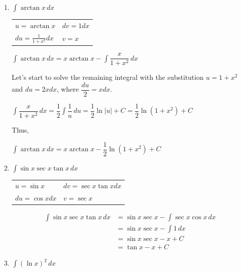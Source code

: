 \documentclass{article}
\begin{document}
\begin{enumerate}
\pspace{\vfill}

\item $\displaystyle \int \arctan x\,dx$ 

\begin{solution}
\begin{center}
    \begin{tabular}{ l l }
  $u=\arctan x$ &  $dv =1 dx$  \\
  $du=\frac{1}{1+x^2}dx$ &  $v=x$  \\
\end{tabular}

$\displaystyle \int \arctan x\,dx = x\arctan x - \displaystyle \int \dfrac{x}{1+x^2}\,dx$
\end{center}
Let's start to solve the remaining integral with the substitution $u=1+x^2$ and $du=2xdx$, where $\dfrac{du}{2}=xdx$.
\begin{center}
$\displaystyle \int \dfrac{x}{1+x^2}\,dx=\dfrac{1}{2}\displaystyle \int \dfrac{1}{u}\,du=\dfrac{1}{2}\ln |u|+C=\dfrac{1}{2}\ln(1+x^2)+C$ 
\end{center}
Thus,
\begin{center}
$\displaystyle \int \arctan x\,dx = x\arctan x - \dfrac{1}{2}\ln(1+x^2)+C$    
\end{center}
\end{solution}
\pspace{\vfill}
\pspace{\newpage}
\item $\displaystyle \int \sin x \sec x \tan x\,dx$ 

\begin{solution}
    \begin{center}
    \begin{tabular}{ l l }
  $u=\sin x$ &  $dv =\sec x \tan x dx$  \\
  $du=\cos xdx$ &  $v=\sec x$  \\
\end{tabular}
\begin{align*}
\displaystyle \int \sin x \sec x \tan x\,dx &= \sin x \sec x - \displaystyle \int \sec x \cos x \,dx \\ &= \sin x \sec x - \displaystyle \int 1 \,dx \\ &= \sin x \sec x - x + C \\ &= \tan x - x + C
\end{align*}
\end{center}
\end{solution}
\pspace{\vfill}
\item $\displaystyle \int (\ln x)^2\,dx$


\end{enumerate}
\end{document}
